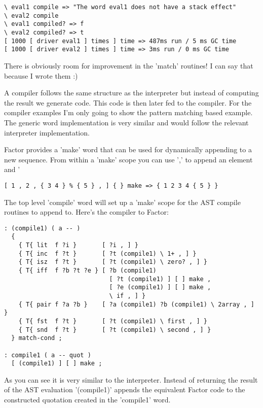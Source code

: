 \begin{verbatim}
\ eval1 compile => "The word eval1 does not have a stack effect"
\ eval2 compile 
\ eval1 compiled? => f
\ eval2 compiled? => t
[ 1000 [ driver eval1 ] times ] time => 487ms run / 5 ms GC time
[ 1000 [ driver eval2 ] times ] time => 3ms run / 0 ms GC time
\end{verbatim}

There is obviously room for improvement in the 'match' routines! I can
say that because I wrote them :)

A compiler follows the same structure as the interpreter but instead
of computing the result we generate code. This code is then later fed
to the compiler. For the compiler examples I'm only going to show the
pattern matching based example. The generic word implementation is
very similar and would follow the relevant interpreter implementation.

Factor provides a 'make' word that can be used for dynamically appending to a new sequence. From within a 'make' scope you can use ',' to append an element and '%

\begin{verbatim}
[ 1 , 2 , { 3 4 } % { 5 } , ] { } make => { 1 2 3 4 { 5 } }
\end{verbatim}

The top level 'compile' word will set up a 'make' scope for the AST
compile routines to append to. Here's the compiler to Factor:

\begin{verbatim}
: (compile1) ( a -- )
  {
    { T{ lit  f ?i }       [ ?i , ] }
    { T{ inc  f ?t }       [ ?t (compile1) \ 1+ , ] }
    { T{ isz  f ?t }       [ ?t (compile1) \ zero? , ] }
    { T{ iff  f ?b ?t ?e } [ ?b (compile1) 
                             [ ?t (compile1) ] [ ] make , 
                             [ ?e (compile1) ] [ ] make , 
                             \ if , ] }
    { T{ pair f ?a ?b }    [ ?a (compile1) ?b (compile1) \ 2array , ] }
    { T{ fst  f ?t }       [ ?t (compile1) \ first , ] }
    { T{ snd  f ?t }       [ ?t (compile1) \ second , ] }
  } match-cond ;  

: compile1 ( a -- quot )
  [ (compile1) ] [ ] make ;
\end{verbatim}

As you can see it is very similar to the interpreter. Instead of
returning the result of the AST evaluation '(compile1)' appends the
equivalent Factor code to the constructed quotation created in the
'compile1' word.

